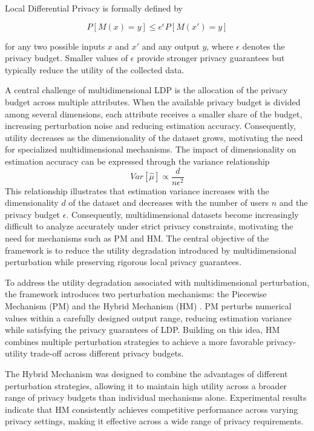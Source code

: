 \documentclass[sigconf]{acmart}
\begin{document}
Local Differential Privacy is formally defined by

\begin{equation}
P[M(x)=y] \leq e^{\epsilon} P[M(x')=y]
\end{equation}

for any two possible inputs $x$ and $x'$ and any output $y$, where $\epsilon$ denotes the privacy budget. Smaller values of $\epsilon$ provide stronger privacy guarantees but typically reduce the utility of the collected data.

A central challenge of multidimensional LDP is the allocation of the privacy budget across multiple attributes. When the available privacy budget is divided among several dimensions, each attribute receives a smaller share of the budget, increasing perturbation noise and reducing estimation accuracy. Consequently, utility decreases as the dimensionality of the dataset grows, motivating the need for specialized multidimensional mechanisms.
The impact of dimensionality on estimation accuracy can be expressed through the variance relationship
\begin{equation}
Var[\hat{\mu}] \propto \frac{d}{n\epsilon^2}
\end{equation}
This relationship illustrates that estimation variance increases with the dimensionality $d$ of the dataset and decreases with the number of users $n$ and the privacy budget $\epsilon$. Consequently, multidimensional datasets become increasingly difficult to analyze accurately under strict privacy constraints, motivating the need for mechanisms such as PM and HM.
The central objective of the framework is to reduce the utility degradation introduced by multidimensional perturbation while preserving rigorous local privacy guarantees.

To address the utility degradation associated with multidimensional perturbation, the framework introduces two perturbation mechanisms: the Piecewise Mechanism (PM) and the Hybrid Mechanism (HM)
. PM perturbs numerical values within a carefully designed output range, reducing estimation variance while satisfying the privacy guarantees of LDP. Building on this idea, HM combines multiple perturbation strategies to achieve a more favorable privacy-utility trade-off across different privacy budgets.

The Hybrid Mechanism was designed to combine the advantages of different perturbation strategies, allowing it to maintain high utility across a broader range of privacy budgets than individual mechanisms alone. Experimental results indicate that HM consistently achieves competitive performance across varying privacy settings, making it effective across a wide range of privacy requirements.
\end{document}
